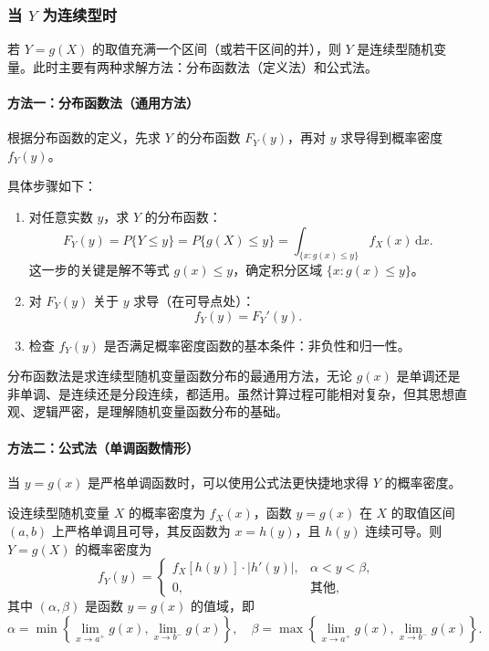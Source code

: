 \documentclass[lang=cn,11pt]{elegantbook}
\begin{document}
\subsubsection{当 $Y$ 为连续型时} 

若 $Y = g(X)$ 的取值充满一个区间（或若干区间的并），则 $Y$ 是连续型随机变量。此时主要有两种求解方法：分布函数法（定义法）和公式法。

\paragraph{方法一：分布函数法（通用方法）} \label{par:distribution-function-method}
根据分布函数的定义，先求 $Y$ 的分布函数 $F_Y(y)$，再对 $y$ 求导得到概率密度 $f_Y(y)$。

具体步骤如下：
\begin{enumerate}
    \item 对任意实数 $y$，求 $Y$ 的分布函数：
    \[
    F_Y(y) = P\{Y \le y\} = P\{g(X) \le y\} = \int_{\{x: g(x) \le y\}} f_X(x) \,\mathrm{d}x.
    \]
    这一步的关键是解不等式 $g(x) \le y$，确定积分区域 $\{x: g(x) \le y\}$。
    
    \item 对 $F_Y(y)$ 关于 $y$ 求导（在可导点处）：
    \[
    f_Y(y) = F_Y'(y).
    \]
    
    \item 检查 $f_Y(y)$ 是否满足概率密度函数的基本条件：非负性和归一性。
\end{enumerate}

\begin{note}
分布函数法是求连续型随机变量函数分布的最通用方法，无论 $g(x)$ 是单调还是非单调、是连续还是分段连续，都适用。虽然计算过程可能相对复杂，但其思想直观、逻辑严密，是理解随机变量函数分布的基础。
\end{note}

\paragraph{方法二：公式法（单调函数情形）} \label{par:formula-method}
当 $y = g(x)$ 是严格单调函数时，可以使用公式法更快捷地求得 $Y$ 的概率密度。

\begin{theorem}[随机变量函数的密度公式] \label{thm:function-density-formula}
设连续型随机变量 $X$ 的概率密度为 $f_X(x)$，函数 $y = g(x)$ 在 $X$ 的取值区间 $(a,b)$ 上严格单调且可导，其反函数为 $x = h(y)$，且 $h(y)$ 连续可导。则 $Y = g(X)$ 的概率密度为
\[
f_Y(y) = \begin{cases}
f_X[h(y)] \cdot |h'(y)|, & \alpha < y < \beta, \\
0, & \text{其他},
\end{cases}
\]
其中 $(\alpha, \beta)$ 是函数 $y = g(x)$ 的值域，即
\[
\alpha = \min\left\{\lim_{x \to a^+} g(x), \lim_{x \to b^-} g(x)\right\}, \quad \beta = \max\left\{\lim_{x \to a^+} g(x), \lim_{x \to b^-} g(x)\right\}.
\]
\end{theorem}
\end{document}
